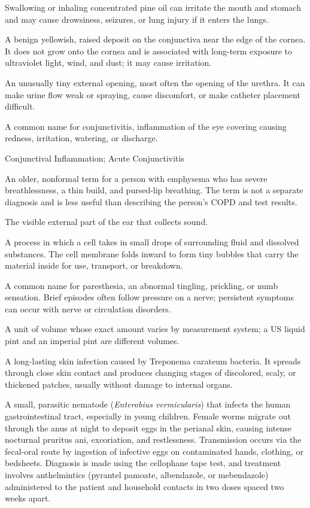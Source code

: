  Swallowing or inhaling concentrated pine oil can irritate the mouth and stomach and may cause drowsiness, seizures, or lung injury if it enters the lungs.

 A benign yellowish, raised deposit on the conjunctiva near the edge of the cornea. It does not grow onto the cornea and is associated with long-term exposure to ultraviolet light, wind, and dust; it may cause irritation.

 An unusually tiny external opening, most often the opening of the urethra. It can make urine flow weak or spraying, cause discomfort, or make catheter placement difficult.

 A common name for conjunctivitis, inflammation of the eye covering causing redness, irritation, watering, or discharge.

\synonyms
Conjunctival Inflammation; Acute Conjunctivitis

 An older, nonformal term for a person with emphysema who has severe breathlessness, a thin build, and pursed-lip breathing. The term is not a separate diagnosis and is less useful than describing the person's COPD and test results.

 The visible external part of the ear that collects sound.

 A process in which a cell takes in small drops of surrounding fluid and dissolved substances. The cell membrane folds inward to form tiny bubbles that carry the material inside for use, transport, or breakdown.

 A common name for paresthesia, an abnormal tingling, prickling, or numb sensation. Brief episodes often follow pressure on a nerve; persistent symptoms can occur with nerve or circulation disorders.

 A unit of volume whose exact amount varies by measurement system; a US liquid pint and an imperial pint are different volumes.

 A long-lasting skin infection caused by Treponema carateum bacteria. It spreads through close skin contact and produces changing stages of discolored, scaly, or thickened patches, usually without damage to internal organs.

 A small, parasitic nematode (\textit{Enterobius vermicularis}) that infects the human gastrointestinal tract, especially in young children. Female worms migrate out through the anus at night to deposit eggs in the perianal skin, causing intense nocturnal pruritus ani, excoriation, and restlessness. Transmission occurs via the fecal-oral route by ingestion of infective eggs on contaminated hands, clothing, or bedsheets. Diagnosis is made using the cellophane tape test, and treatment involves anthelmintics (pyrantel pamoate, albendazole, or mebendazole) administered to the patient and household contacts in two doses spaced two weeks apart.

